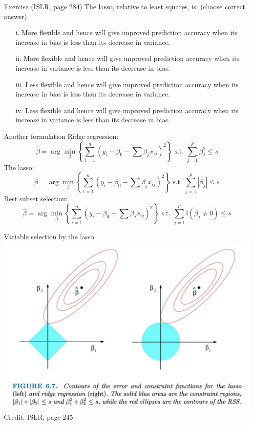 \documentclass{beamer}
\begin{document}
  \begin{frame}{Exercise (ISLR, page 284)}
    The lasso, relative to least squares, is: (choose correct answer)
    \begin{itemize}
      \item[i.] More flexible and hence will give improved prediction accuracy when its increase in bias is less than its decrease in variance.
      \item[ii.] More flexible and hence will give improved prediction accuracy when its increase in variance is less than its decrease in bias.
      \item[iii.] Less flexible and hence will give improved prediction accuracy when its increase in bias is less than its decrease in variance.
      \item[iv.] Less flexible and hence will give improved prediction accuracy when its increase in variance is less than its decrease in bias.
    \end{itemize}
  \end{frame}

  \begin{frame}{Another formulation}
    \small
    Ridge regression:
    $$\hat\beta = \arg\min_\beta \left\{ \sum_{i = 1}^n \left(y_i - \beta_0 - \sum\beta_j x_{ij}\right)^2 \right\} \mbox{ s.t. } \sum_{j = 1}^p \beta_j^2 \le s$$
    The lasso:
    $$\hat\beta = \arg\min_\beta \left\{ \sum_{i = 1}^n \left(y_i - \beta_0 - \sum\beta_j x_{ij}\right)^2 \right\} \mbox{ s.t. } \sum_{j = 1}^p |\beta_j| \le s$$
    Best subset selection:
    $$\hat\beta = \arg\min_\beta \left\{ \sum_{i = 1}^n \left(y_i - \beta_0 - \sum\beta_j x_{ij}\right)^2 \right\} \mbox{ s.t. } \sum_{j = 1}^p \mathbb{I}(\beta_j \ne 0) \le s$$
  \end{frame}

  \begin{frame}{Variable selection by the lasso}
    \includegraphics[width = \textwidth]{images/variable_selection.png}
    \vfill
    \hfill \footnotesize Credit: ISLR, page 245
  \end{frame}
\end{document}
